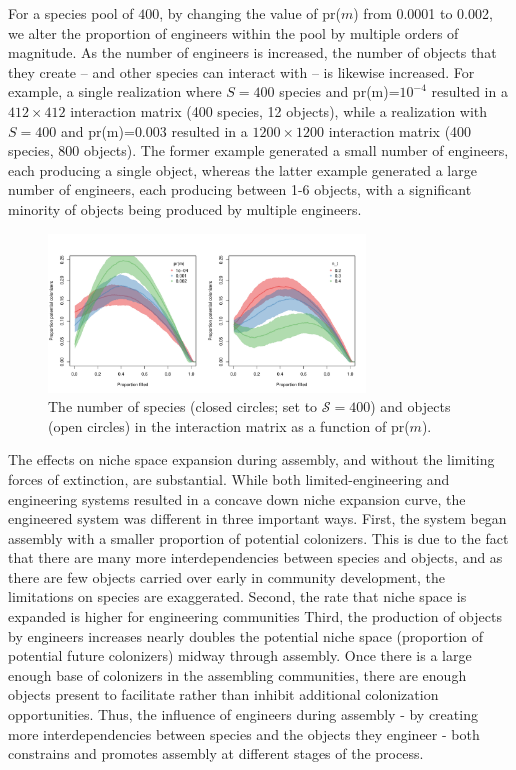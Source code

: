 \documentclass[twocolumn,preprintnumbers,amsmath,amssymb,superscriptaddress]{revtex4}
\begin{document}
For a species pool of $400$, by changing the value of pr($m$) from 0.0001 to 0.002, we alter the proportion of engineers within the pool by multiple orders of magnitude.
As the number of engineers is increased, the number of objects that they create -- and other species can interact with -- is likewise increased.
For example, a single realization where $S=400$ species and pr(m)=$10^{-4}$ resulted in a $412\times412$ interaction matrix (400 species, 12 objects), while a realization with $S=400$ and pr(m)=$0.003$ resulted in a $1200\times1200$ interaction matrix (400 species, 800 objects).
The former example generated a small number of engineers, each producing a single object, whereas the latter example generated a large number of engineers, each producing between 1-6 objects, with a significant minority of objects being produced by multiple engineers.

\begin{figure}[ht]
\centering
\includegraphics[width=0.75\textwidth]{fig_potcol_comb.pdf}
\caption{
The number of species (closed circles; set to $\mathcal S=400$) and objects (open circles) in the interaction matrix as a function of pr($m$).
}
\label{fig_potcol}
\end{figure} 

The effects on niche space expansion during assembly, and without the limiting forces of extinction, are substantial.
While both limited-engineering and engineering systems resulted in a concave down niche expansion curve, the engineered system was different in three important ways.
First, the system began assembly with a smaller proportion of potential colonizers.
This is due to the fact that there are many more interdependencies between species and objects, and as there are few objects carried over early in community development, the limitations on species are exaggerated.
Second, the rate that niche space is expanded is higher for engineering communities
Third, the production of objects by engineers increases nearly doubles the potential niche space (proportion of potential future colonizers) midway through assembly.
Once there is a large enough base of colonizers in the assembling communities, there are enough objects present to facilitate rather than inhibit additional colonization opportunities.
Thus, the influence of engineers during assembly - by creating more interdependencies between species and the objects they engineer - both constrains and promotes assembly at different stages of the process.
\end{document}
